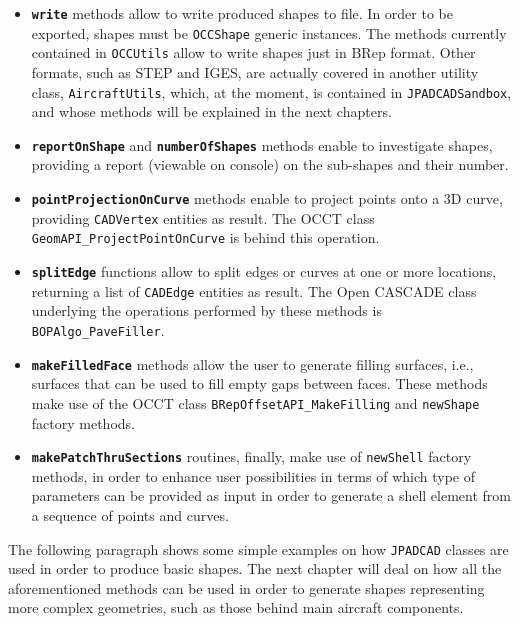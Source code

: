 \begin{itemize}
\renewcommand\labelitemi{\tiny$\blacksquare$}
\item \textbf{\lstinline[language=Java]!write!} methods allow to write produced shapes to file. In order to be exported, shapes must be \lstinline[language=Java]!OCCShape! generic instances. The methods currently contained in \lstinline[language=Java]!OCCUtils! allow to write shapes just in BRep format. Other formats, such as STEP and IGES, are actually covered in another utility class, \lstinline[language=Java]!AircraftUtils!, which, at the moment, is contained in \lstinline[language=Java]!JPADCADSandbox!, and whose methods will be explained in the next chapters.
\item \textbf{\lstinline[language=Java]!reportOnShape!} and \textbf{\lstinline[language=Java]!numberOfShapes!} methods enable to investigate shapes, providing a report (viewable on console) on the sub-shapes and their number.
\item \textbf{\lstinline[language=Java]!pointProjectionOnCurve!} methods enable to project points onto a 3D curve, providing \lstinline[language=Java]!CADVertex! entities as result. The \gls{OCCT} class \lstinline[language=Java]!GeomAPI_ProjectPointOnCurve! is behind this operation.
\item \textbf{\lstinline[language=Java]!splitEdge!} functions allow to split edges or curves at one or more locations, returning a list of \lstinline[language=Java]!CADEdge! entities as result. The Open CASCADE class underlying the operations performed by these methods is \lstinline[language=Java]!BOPAlgo_PaveFiller!.
\item \textbf{\lstinline[language=Java]!makeFilledFace!} methods allow the user to generate filling surfaces, i.e., surfaces that can be used to fill empty gaps between faces. These methods make use of the \gls{OCCT} class \lstinline[language=Java]!BRepOffsetAPI_MakeFilling! and \lstinline[language=Java]!newShape! factory methods.
\item \textbf{\lstinline[language=Java]!makePatchThruSections!} routines, finally, make use of \lstinline[language=Java]!newShell! factory methods, in order to enhance user possibilities in terms of which type of parameters can be provided as input in order to generate a shell element from a sequence of points and curves.
\end{itemize}
%

\bigskip
\noindent
The following paragraph shows some simple examples on how \lstinline[language=Java]!JPADCAD! classes are used in order to produce basic shapes. The next chapter will deal on how all the aforementioned methods can be used in order to generate shapes representing more complex geometries, such as those behind main aircraft components.

